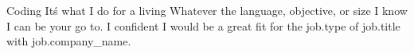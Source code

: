 Coding
It\'s what I do for a living
Whatever the language, objective, or size I know I can be your go to. I confident I would be a great fit for the {{job.type}} of {{job.title}} with {{job.company_name}}.